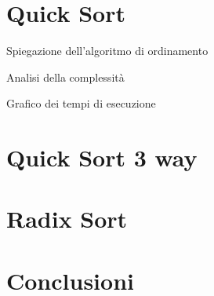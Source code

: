 \documentclass[a4paper, 12pt, oneside]{book}
\begin{document}

\chapter{Quick Sort}\label{chap:Quick Sort} %

Spiegazione dell'algoritmo di ordinamento

Analisi della complessità

Grafico dei tempi di esecuzione


\chapter{Quick Sort 3 way}\label{chap:Quick Sort 3 way} %


\chapter{Radix Sort}\label{chap:Radix Sort} %


\chapter{Conclusioni}\label{chap:Conclusioni} %

\end{document}
